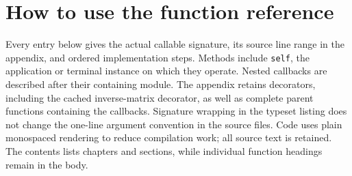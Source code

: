 \section{How to use the function reference}
Every entry below gives the actual callable signature, its source line range in the appendix, and ordered implementation steps. Methods include \texttt{self}, the application or terminal instance on which they operate. Nested callbacks are described after their containing module. The appendix retains decorators, including the cached inverse-matrix decorator, as well as complete parent functions containing the callbacks. Signature wrapping in the typeset listing does not change the one-line argument convention in the source files. Code uses plain monospaced rendering to reduce compilation work; all source text is retained. The contents lists chapters and sections, while individual function headings remain in the body.
